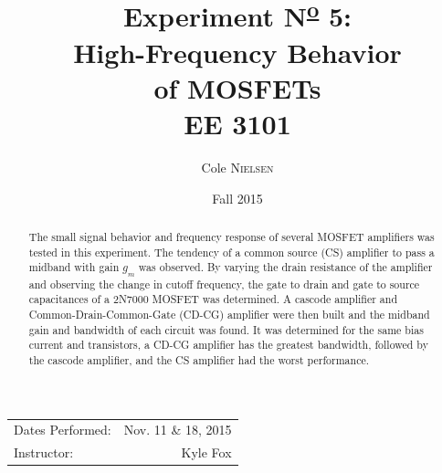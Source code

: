 \documentclass[12pt]{article}
\title{Experiment N\textsuperscript{\underline{o}} 5:   \\ High-Frequency Behavior\\ of
MOSFETs\\ \vspace{0.3 in} EE 3101}
\author{Cole \textsc{Nielsen}}
\date{Fall 2015}
\begin{document}
\maketitle 

\begin{center}
 \begin{tabular}{l r}
   Dates Performed: & Nov. 11 \& 18, 2015 \\ 
   Instructor: & Kyle Fox \\ 
\end{tabular}
\end{center}
\pagebreak
\begin{abstract}
\noindent 
The small signal behavior and frequency response of several MOSFET amplifiers was tested in this experiment. The tendency of a common source (CS) amplifier to pass a midband with gain $g_m$ was observed. By varying the drain resistance of the amplifier and observing the change in cutoff frequency, the gate to drain and gate to source capacitances of a 2N7000 MOSFET was determined. A cascode amplifier and Common-Drain-Common-Gate (CD-CG) amplifier were then built and the midband gain and bandwidth of each circuit was found. It was determined for the same bias current and transistors, a CD-CG amplifier has the greatest bandwidth, followed by the cascode amplifier, and the CS amplifier had the worst performance.
\end{abstract}
\hrulefill
\end{document}
